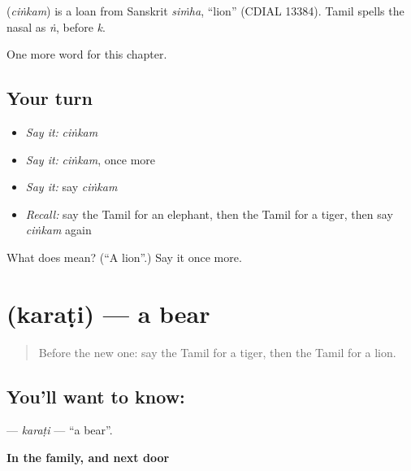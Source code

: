 \begin{cousinweb}
\textbf{} (\emph{ciṅkam}) is a loan from Sanskrit \emph{siṁha}, \textquotedblleft{}lion\textquotedblright{} (CDIAL 13384). Tamil spells the nasal as \emph{ṅ}, before \emph{k}.
\end{cousinweb}

\begin{grammarlens}[title={What you've built}]
One more word for this chapter.
\end{grammarlens}

\subsection*{Your turn}
\begin{itemize}
\raggedright
  \item \emph{Say it:} \emph{ciṅkam}
  \item \emph{Say it:} \emph{ciṅkam}, once more
  \item \emph{Say it:} say \emph{ciṅkam}
  \item \emph{Recall:} say the Tamil for an elephant, then the Tamil for a tiger, then say \emph{ciṅkam} again
\end{itemize}

\begin{tcolorbox}[breakable,colback=teal!4,colframe=teal!35!black,title={Before you move on}]
What does  mean? (\textquotedblleft{}A lion\textquotedblright{}.) Say it once more.
\end{tcolorbox}
\section[\texorpdfstring{\ta{கரடி} (karaṭi)}{கரடி (karaṭi)}]{ (karaṭi) — a bear}

\label{lesson:TA-C129-karati}



\begin{quote}
Before the new one: say the Tamil for a tiger, then the Tamil for a lion.
\end{quote}

\subsection*{You'll want to know: }
\textbf{} — \emph{karaṭi} — \textquotedblleft{}a bear\textquotedblright{}.

\textbf{In the family, and next door}

